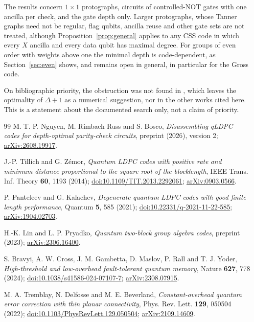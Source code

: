 \documentclass[11pt,a4paper]{article}
\theoremstyle{definition}
\theoremstyle{plain}
\begin{document}
The results concern $1\times1$ protographs, circuits of controlled-NOT gates
with one ancilla per check, and the gate depth only. Larger protographs,
whose Tanner graphs need not be regular, flag qubits, ancilla reuse and other
gate sets are not treated, although Proposition~\ref{prop:general} applies to
any CSS code in which every $X$ ancilla and every data qubit has maximal
degree. For groups of even order with weights above one the minimal depth is
code-dependent, as Section~\ref{sec:even} shows, and remains open in general,
in particular for the Gross code.

On bibliographic priority, the obstruction was not found in
\cite{NRB2026}, which leaves the optimality of $\Delta+1$ as a numerical
suggestion, nor in the other works cited here. This is a statement about the
documented search only, not a claim of priority.

\clearpage
\begingroup\small
\begin{thebibliography}{99}
\setlength{\itemsep}{2pt}
M. T. P. Nguyen, M. Rimbach-Russ and S. Bosco,
\emph{Disassembling qLDPC codes for depth-optimal parity-check circuits},
preprint (2026), version 2;
\href{https://arxiv.org/abs/2608.19917}{arXiv:2608.19917}.

J.-P. Tillich and G. Z\'emor,
\emph{Quantum LDPC codes with positive rate and minimum distance proportional
to the square root of the blocklength},
IEEE Trans. Inf. Theory \textbf{60}, 1193 (2014);
\href{https://doi.org/10.1109/TIT.2013.2292061}{doi:10.1109/TIT.2013.2292061};
\href{https://arxiv.org/abs/0903.0566}{arXiv:0903.0566}.

P. Panteleev and G. Kalachev,
\emph{Degenerate quantum LDPC codes with good finite length performance},
Quantum \textbf{5}, 585 (2021);
\href{https://doi.org/10.22331/q-2021-11-22-585}{doi:10.22331/q-2021-11-22-585};
\href{https://arxiv.org/abs/1904.02703}{arXiv:1904.02703}.

H.-K. Lin and L. P. Pryadko,
\emph{Quantum two-block group algebra codes},
preprint (2023);
\href{https://arxiv.org/abs/2306.16400}{arXiv:2306.16400}.

S. Bravyi, A. W. Cross, J. M. Gambetta, D. Maslov, P. Rall and T. J. Yoder,
\emph{High-threshold and low-overhead fault-tolerant quantum memory},
Nature \textbf{627}, 778 (2024);
\href{https://doi.org/10.1038/s41586-024-07107-7}{doi:10.1038/s41586-024-07107-7};
\href{https://arxiv.org/abs/2308.07915}{arXiv:2308.07915}.

M. A. Tremblay, N. Delfosse and M. E. Beverland,
\emph{Constant-overhead quantum error correction with thin planar
connectivity},
Phys. Rev. Lett. \textbf{129}, 050504 (2022);
\href{https://doi.org/10.1103/PhysRevLett.129.050504}{doi:10.1103/PhysRevLett.129.050504};
\href{https://arxiv.org/abs/2109.14609}{arXiv:2109.14609}.
\end{thebibliography}
\endgroup
\end{document}
